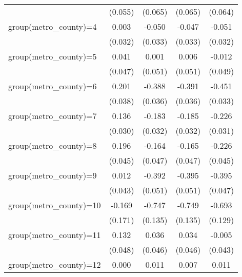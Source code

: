 {\begin{tabular}{l*{4}{c}}
                    &     (0.055)         &     (0.065)         &     (0.065)         &     (0.064)         \\
group(metro\_county)=4&       0.003         &      -0.050         &      -0.047         &      -0.051         \\
                    &     (0.032)         &     (0.033)         &     (0.033)         &     (0.032)         \\
group(metro\_county)=5&       0.041         &       0.001         &       0.006         &      -0.012         \\
                    &     (0.047)         &     (0.051)         &     (0.051)         &     (0.049)         \\
group(metro\_county)=6&       0.201\sym{***}&      -0.388\sym{***}&      -0.391\sym{***}&      -0.451\sym{***}\\
                    &     (0.038)         &     (0.036)         &     (0.036)         &     (0.033)         \\
group(metro\_county)=7&       0.136\sym{***}&      -0.183\sym{***}&      -0.185\sym{***}&      -0.226\sym{***}\\
                    &     (0.030)         &     (0.032)         &     (0.032)         &     (0.031)         \\
group(metro\_county)=8&       0.196\sym{***}&      -0.164\sym{***}&      -0.165\sym{***}&      -0.226\sym{***}\\
                    &     (0.045)         &     (0.047)         &     (0.047)         &     (0.045)         \\
group(metro\_county)=9&       0.012         &      -0.392\sym{***}&      -0.395\sym{***}&      -0.395\sym{***}\\
                    &     (0.043)         &     (0.051)         &     (0.051)         &     (0.047)         \\
group(metro\_county)=10&      -0.169         &      -0.747\sym{***}&      -0.749\sym{***}&      -0.693\sym{***}\\
                    &     (0.171)         &     (0.135)         &     (0.135)         &     (0.129)         \\
group(metro\_county)=11&       0.132\sym{**} &       0.036         &       0.034         &      -0.005         \\
                    &     (0.048)         &     (0.046)         &     (0.046)         &     (0.043)         \\
group(metro\_county)=12&       0.000         &       0.011         &       0.007         &       0.011         \\

\end{tabular}}
